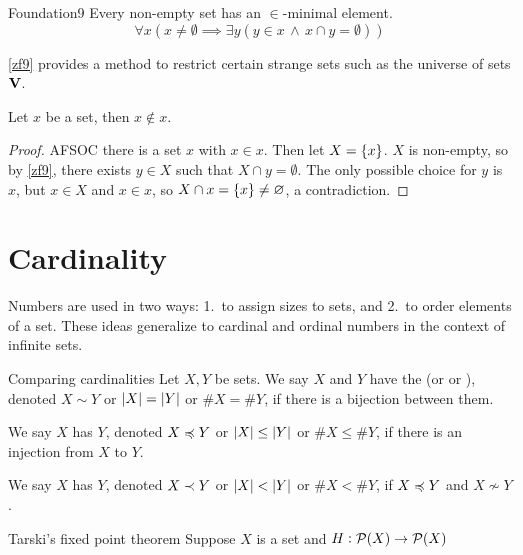 \documentclass{styles/tufte}
\begin{document}
\begin{zf}{Foundation}{9}
  Every non-empty set has an $\in$-minimal element.
  \[ \forall x \left(x \neq \emptyset \implies \exists y (y \in x \,\land\, x \cap y = \emptyset)\right) \]
\end{zf}

\cref{zf9} provides a method to restrict certain strange sets such as the universe of sets $\mathbf{V}$.

\begin{theorem}{}{}
  Let $x$ be a set, then $x \notin x$.
\end{theorem}
\begin{proof}
  AFSOC there is a set $x$ with $x \in x$. Then let $X = \set{x}$. $X$ is non-empty, so by \cref{zf9}, there exists $y \in X$ such that $X \cap y = \emptyset$. The only possible choice for $y$ is $x$, but $x \in X$ and $x \in x$, so $X \cap x = \set{x} \neq \emptyset$, a contradiction.
\end{proof}



\section{Cardinality}

Numbers are used in two ways: 1.~to assign sizes to sets, and 2.~to order elements of a set. These ideas generalize to cardinal and ordinal numbers in the context of infinite sets.

\begin{definition}{Comparing cardinalities}{}
  Let $X, Y$ be sets. We say $X$ and $Y$ have the  (or  or ), denoted $X \sim Y$ or $\abs{X} = \abs{Y}$ or $\# X = \# Y$, if there is a bijection between them.
  
  We say $X$ has  $Y$, denoted $X \preccurlyeq Y$ or $\abs{X} \leq \abs{Y}$ or $\# X \leq \# Y$, if there is an injection from $X$ to $Y$.
  
  We say $X$ has  $Y$, denoted $X \prec Y$ or $\abs{X} < \abs{Y}$ or $\# X < \# Y$, if $X \preccurlyeq Y$ and $X \not\sim Y$.
\end{definition}

\begin{lemma}{Tarski's fixed point theorem}{}
  Suppose $X$ is a set and $H: \mathcal{P}(X) \to \mathcal{P}(X)$
\end{lemma}
\end{document}
